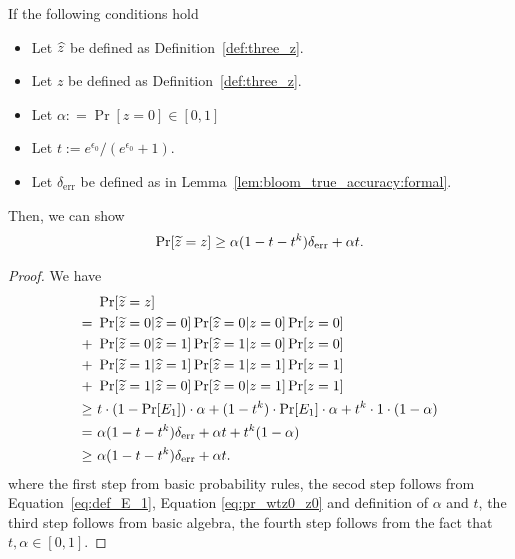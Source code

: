 \begin{theorem}\label{thm:dpbloom_true_accuracy:formal}

If the following conditions hold
\begin{itemize}
    \item Let $\widehat{z}$ be defined as Definition~\ref{def:three_z}.
    \item Let $z$ be defined as Definition~\ref{def:three_z}.
    \item Let $\alpha: = \Pr[ z = 0 ] \in [0,1]$
    \item Let $t := e^{\epsilon_0} / (e^{\epsilon_0} + 1)$. 
    \item Let $\delta_{\mathrm{err}}$ be defined as in Lemma~\ref{lem:bloom_true_accuracy:formal}. 
\end{itemize}

Then, we can show 
\begin{align*}
\Pr[ \widetilde{z} = z ] \geq \alpha (1-t-t^k) \delta_{\mathrm{err}} + \alpha t .
\end{align*}
\end{theorem}

\begin{proof}

We have
\begin{align*}
    & ~ \Pr[ \widetilde{z} = z ] \\
    = & ~ \Pr [\widetilde{z} = 0 | \widehat{z} = 0] \Pr [\widehat{z} = 0 | z = 0] \Pr[z=0] \\
    + & ~ \Pr [\widetilde{z} = 0 | \widehat{z} = 1] \Pr [\widehat{z} = 1 | z = 0] \Pr[z=0] \\
    + & ~ \Pr [\widetilde{z} = 1 | \widehat{z} = 1] \Pr [\widehat{z} = 1 | z = 1] \Pr[z=1] \\
    + & ~ \Pr [\widetilde{z} = 1 | \widehat{z} = 0] \Pr [\widehat{z} = 0 | z = 1] \Pr[z=1]\\
    \geq & ~ t \cdot (1 - \Pr[E_1]) \cdot \alpha + (1- t^k) \cdot \Pr[E_1]\cdot \alpha + t^k \cdot 1 \cdot (1-\alpha)\\
     = & ~ \alpha (1-t-t^k) \delta_{\mathrm{err}} + \alpha t + t^k(1-\alpha)\\
     \geq & ~ \alpha (1-t-t^k) \delta_{\mathrm{err}} + \alpha t.
\end{align*}
where the first step from basic probability rules, the secod step follows from Equation~\ref{eq:def_E_1}, Equation \ref{eq:pr_wtz0_z0} and definition of $\alpha$ and $t$, the third step follows from basic algebra,  the fourth step follows from the fact that $t,\alpha \in [0,1]$.

\end{proof}

